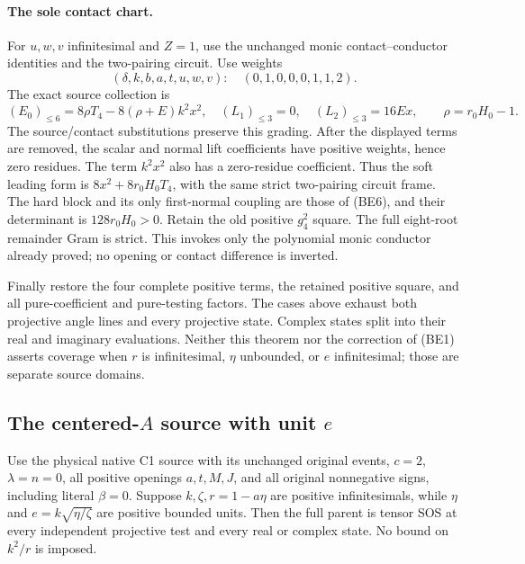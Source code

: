 \paragraph{The sole contact chart.}
For $u,w,v$ infinitesimal and $Z=1$, use the unchanged monic
contact--conductor identities and the two-pairing circuit. Use weights
\[ (\delta,k,b,a,t,u,w,v):\quad(0,1,0,0,0,1,1,2). \]
The exact source collection is
\[
 (E_0)_{\le6}=8\rho T_4-8(\rho+E)k^2x^2,
 \quad (L_1)_{\le3}=0,\quad (L_2)_{\le3}=16Ex,
 \qquad \rho=r_0H_0-1.
\]
The source/contact substitutions preserve this grading. After the
displayed terms are removed, the scalar and normal lift coefficients
have positive weights, hence zero residues. The term $k^2x^2$ also
has a zero-residue coefficient. Thus the soft leading form is
$8x^2+8r_0H_0T_4$, with the same strict two-pairing circuit frame.
The hard block and its only first-normal coupling are those of (BE6),
and their determinant is $128r_0H_0>0$. Retain the old positive
$g_4^2$ square. The full eight-root remainder Gram is strict.
This invokes only the polynomial monic conductor already proved;
no opening or contact difference is inverted.

Finally restore the four complete positive terms, the retained
positive square, and all pure-coefficient and pure-testing factors.
The cases above exhaust both projective angle lines and every
projective state. Complex states split into their real and imaginary
evaluations. Neither this theorem nor the correction of (BE1) asserts
coverage when $r$ is infinitesimal, $\eta$ unbounded, or $e$
infinitesimal; those are separate source domains.



\subsection{The centered-$A$ source with unit $e$}

\label{component:p3763434080c2}

\begin{theorem}
Use the physical native C1 source with its unchanged original events,
$c=2$, $\lambda=n=0$, all positive openings $a,t,M,J$, and all original
nonnegative signs, including literal $\beta=0$.
Suppose $k,\zeta,r=1-a\eta$ are positive infinitesimals, while
$\eta$ and $e=k\sqrt{\eta/\zeta}$ are positive bounded units.
Then the full parent is tensor SOS at every independent projective test
and every real or complex state. No bound on $k^2/r$ is imposed.
\end{theorem}

